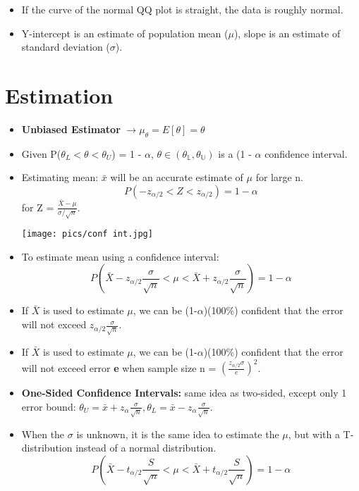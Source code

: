 \documentclass[10pt, letterpaper, twoside]{article}
\newenvironment{Figure}
  {\par\medskip\noindent\minipage{\linewidth}}
  {\endminipage\par\medskip}
\begin{document}
\begin{multicols}{2}
\begin{itemize}
    \item If the curve of the normal QQ plot is straight, the data is roughly normal.
    \item Y-intercept is an estimate of population mean ($\mu$), slope is an estimate of standard deviation ($\sigma$).
\end{itemize}

\section{Estimation}

\begin{itemize}
    \item \textbf{Unbiased Estimator} $\longrightarrow \mu_{\theta} = E[\theta] = \theta$
    \item Given P($\theta_L < \theta < \theta_U$) = 1 - $\alpha$, $\mathbb{\theta \in (\theta_L, \theta_U)}$ is a (1 - $\alpha$ confidence interval.
    \item Estimating mean: $\bar{x}$ will be an accurate estimate of $\mu$ for large n.
    \begin{equation*}
        P(-z_{\alpha/2}< Z < z_{\alpha/2}) = 1 - \alpha
    \end{equation*}
    for Z = $\frac{\bar{X} - \mu}{\sigma/\sqrt{n}}$.
    \begin{Figure}
        \texttt{[image: pics/conf int.jpg]}
    \end{Figure}
    \item To estimate mean using a confidence interval:
    \begin{equation*}
        P(\bar{X} - z_{\alpha/2}\frac{\sigma}{\sqrt{n}} < \mu < \bar{X} + z_{\alpha/2}\frac{\sigma}{\sqrt{n }}) = 1 - \alpha 
    \end{equation*}
    \item If $\bar{X}$ is used to estimate $\mu$, we can be (1-$\alpha$)(100\%) confident that the error will not exceed $z_{\alpha/2}\frac{\sigma}{\sqrt{n}}$.
    \item If $\bar{X}$ is used to estimate $\mu$, we can be (1-$\alpha$)(100\%) confident that the error will not exceed error \textbf{e} when sample size n = $(\frac{z_{\alpha/2}\sigma}{e})^2$.
    \item \textbf{One-Sided Confidence Intervals:} same idea as two-sided, except only 1 error bound: $\theta_U = \bar{x} + z_{\alpha}\frac{\sigma}{\sqrt{n}}, \theta_L = \bar{x} - z_{\alpha}\frac{\sigma}{\sqrt{n}}$.
    \item When the $\sigma$ is unknown, it is the same idea to estimate the $\mu$, but with a T-distribution instead of a normal distribution.
    \begin{equation*}
         P(\bar{X} - t_{\alpha/2}\frac{S}{\sqrt{n}} < \mu < \bar{X} + t_{\alpha/2}\frac{S}{\sqrt{n }}) = 1 - \alpha 
    \end{equation*}
\end{itemize}

\end{multicols}
\end{document}
